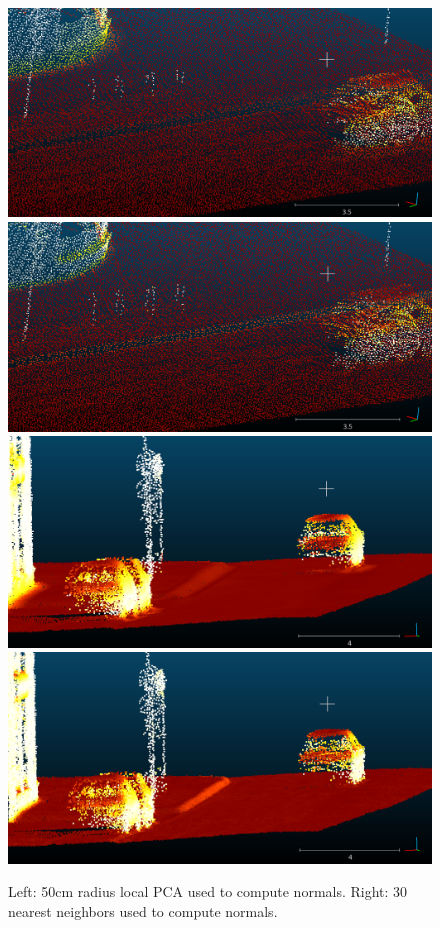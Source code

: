 \documentclass[a4paper]{article}
\begin{document}


\begin{figure}[ht]
  \centering
  \includegraphics[width=0.46\linewidth]{figures/cc_normals_PCA_r=50cm_smooth.png}
  \includegraphics[width=0.46\linewidth]{figures/cc_normals_PCA_50cm_k=30_nearest.png}
  \includegraphics[width=0.46\linewidth]{figures/cc_normals_PCA_r=50cm_v2.png}
  \includegraphics[width=0.46\linewidth]{figures/cc_normals_PCA_50cm_k=30_v2.png}
  \caption{Left: 50cm radius local PCA used to compute normals. 
  Right: 30 nearest neighbors used to compute normals.} 
  \label{fig:local_PCA_neighbor}
\end{figure}
\end{document}

